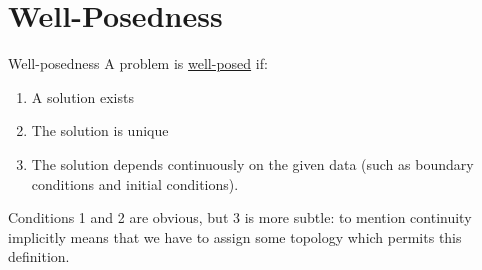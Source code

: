 \documentclass[../Main.tex]{subfiles}
\begin{document}
\section{Well-Posedness}
\begin{definition}{Well-posedness}
    A problem is \underline{well-posed} if:
    \begin{enumerate}
        \item A solution exists
        \item The solution is unique
        \item The solution depends continuously on the given data (such as boundary conditions and initial conditions).
    \end{enumerate}
\end{definition}
Conditions 1 and 2 are obvious, but 3 is more subtle: to mention continuity implicitly means that we have to assign some topology which permits this definition.
\end{document}
